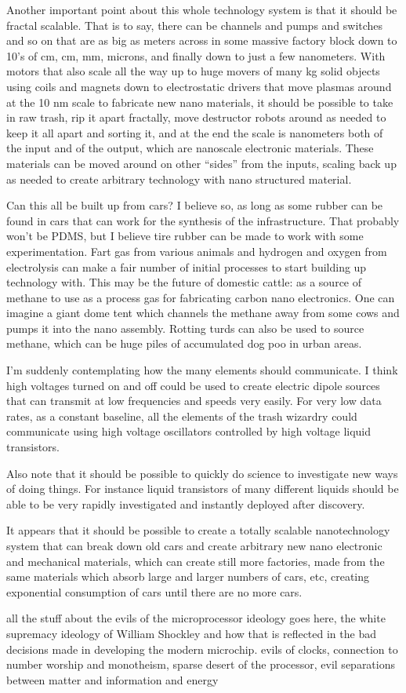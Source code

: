 Another important point about this whole technology system is that it
should be fractal scalable. That is to say, there can be channels and
pumps and switches and so on that are as big as meters across in some
massive factory block down to 10's of cm, cm, mm, microns, and finally
down to just a few nanometers. With motors that also scale all the way
up to huge movers of many kg solid objects using coils and magnets down
to electrostatic drivers that move plasmas around at the 10 nm scale to
fabricate new nano materials, it should be possible to take in raw
trash, rip it apart fractally, move destructor robots around as needed
to keep it all apart and sorting it, and at the end the scale is
nanometers both of the input and of the output, which are nanoscale
electronic materials. These materials can be moved around on other
``sides'' from the inputs, scaling back up as needed to create arbitrary
technology with nano structured material.

Can this all be built up from cars? I believe so, as long as some rubber
can be found in cars that can work for the synthesis of the
infrastructure. That probably won't be PDMS, but I believe tire rubber
can be made to work with some experimentation. Fart gas from various
animals and hydrogen and oxygen from electrolysis can make a fair number
of initial processes to start building up technology with. This may be
the future of domestic cattle: as a source of methane to use as a
process gas for fabricating carbon nano electronics. One can imagine a
giant dome tent which channels the methane away from some cows and pumps
it into the nano assembly. Rotting turds can also be used to source
methane, which can be huge piles of accumulated dog poo in urban areas.

I'm suddenly contemplating how the many elements should communicate. I
think high voltages turned on and off could be used to create electric
dipole sources that can transmit at low frequencies and speeds very
easily. For very low data rates, as a constant baseline, all the
elements of the trash wizardry could communicate using high voltage
oscillators controlled by high voltage liquid transistors.

Also note that it should be possible to quickly do science to
investigate new ways of doing things. For instance liquid transistors of
many different liquids should be able to be very rapidly investigated
and instantly deployed after discovery.

It appears that it should be possible to create a totally scalable
nanotechnology system that can break down old cars and create arbitrary
new nano electronic and mechanical materials, which can create still
more factories, made from the same materials which absorb large and
larger numbers of cars, etc, creating exponential consumption of cars
until there are no more cars.

all the stuff about the evils of the microprocessor ideology goes here,
the white supremacy ideology of William Shockley and how that is
reflected in the bad decisions made in developing the modern microchip.
evils of clocks, connection to number worship and monotheism, sparse
desert of the processor, evil separations between matter and information
and energy
